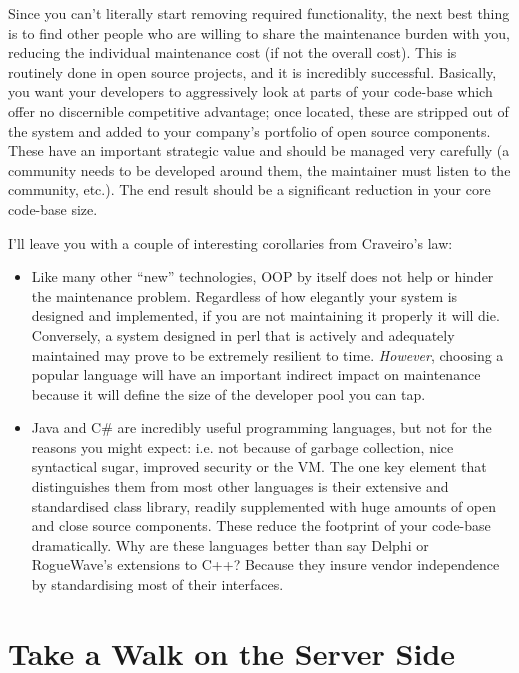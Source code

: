 \documentclass{book}
\begin{document}
Since you can't literally start removing required functionality, the
next best thing is to find other people who are willing to share the
maintenance burden with you, reducing the individual maintenance cost
(if not the overall cost). This is routinely done in open source
projects, and it is incredibly successful. Basically, you want your
developers to aggressively look at parts of your code-base which offer
no discernible competitive advantage; once located, these are stripped
out of the system and added to your company's portfolio of open source
components. These have an important strategic value and should be
managed very carefully (a community needs to be developed around them,
the maintainer must listen to the community, etc.). The end result
should be a significant reduction in your core code-base size.

I'll leave you with a couple of interesting corollaries from
Craveiro's law:

\begin{itemize}
\item Like many other ``new'' technologies, OOP by itself does not help
  or hinder the maintenance problem. Regardless of how elegantly your
  system is designed and implemented, if you are not maintaining it
  properly it will die. Conversely, a system designed in perl that is
  actively and adequately maintained may prove to be extremely
  resilient to time. \emph{However}, choosing a popular language will
  have an important indirect impact on maintenance because it will
  define the size of the developer pool you can tap.
\item Java and C\# are incredibly useful programming languages, but not
  for the reasons you might expect: i.e. not because of garbage
  collection, nice syntactical sugar, improved security or the VM. The
  one key element that distinguishes them from most other languages is
  their extensive and standardised class library, readily supplemented
  with huge amounts of open and close source components. These reduce
  the footprint of your code-base dramatically. Why are these
  languages better than say Delphi or RogueWave's extensions to C++?
  Because they insure vendor independence by standardising most of
  their interfaces.
\end{itemize}

\chapter{Take a Walk on the Server Side}
\end{document}
